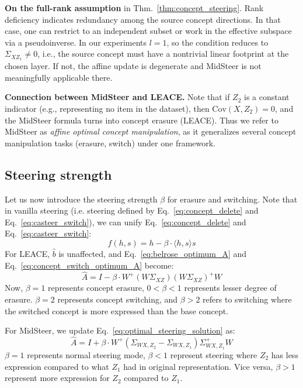\documentclass{article}
\theoremstyle{plain}
\theoremstyle{definition}
\theoremstyle{remark}
\newcommand{\cov}{\mathrm{Cov}}
\begin{document}
\textbf{On the full-rank assumption} in Thm.~\ref{thm:concept_steering}.
Rank deficiency indicates redundancy among the source concept directions. In that case, one can restrict to an independent subset or work in the effective subspace via a pseudoinverse. In our experiments $l=1$, so the condition reduces to $\Sigma_{XZ_1}\ne 0$, i.e., the source concept must have a nontrivial linear footprint at the chosen layer. If not, the affine update is degenerate and MidSteer is not meaningfully applicable there.


\textbf{Connection between MidSteer and LEACE.} Note that if $Z_2$ is a constant indicator (e.g., representing no item in the dataset), then $\cov(X, Z_2) = 0$, and the MidSteer formula turns into concept erasure (LEACE). Thus we refer to MidSteer as \textit{affine optimal concept manipulation}, as it generalizes several concept manipulation tasks (erasure, switch) under one framework.

\subsection{Steering strength}

Let us now introduce the steering strength $\beta$ for erasure and switching. Note that in vanilla steering (i.e. steering defined by Eq.~\ref{eq:concept_delete} and Eq.~\ref{eq:casteer_switch}), we can unify Eq.~\ref{eq:concept_delete} and Eq.~\ref{eq:casteer_switch}:
\begin{equation}
	f(h, s) = h - \beta \cdot \langle h, s \rangle s
	\label{eq:vanilla_with_beta}
\end{equation}
For LEACE, $\widehat{b}$ is unaffected, and Eq.~\ref{eq:belrose_optimum_A} and Eq.~\ref{eq:concept_switch_optimum_A} become:
\begin{equation}
	\label{eq:leace_with_beta_A}
	\widehat{A} = I - \beta \cdot W^+(W \Sigma_{XZ}) (W \Sigma_{XZ})^+ W
\end{equation}
Now, $\beta=1$ represents concept erasure, $0 < \beta < 1$ represents lesser degree of erasure. $\beta=2$ represents concept switching, and $\beta > 2$ refers to switching where the switched concept is more expressed than the base concept.

For MidSteer, we update Eq.~\ref{eq:optimal_steering_solution} as:
\begin{equation}
	\label{eq:midsteer_with_beta_A}
	\widehat{A} = I + \beta \cdot W^+ (\Sigma_{WX, Z_2} - \Sigma_{WX, Z_1})\Sigma_{WX, Z_1}^+ W
\end{equation}
$\beta = 1$ represents normal steering mode, $\beta < 1$ represent steering where $Z_2$ has less expression compared to what $Z_1$ had in original representation. Vice versa, $\beta > 1$ represent more expression for $Z_2$ compared to $Z_1$.
\end{document}
